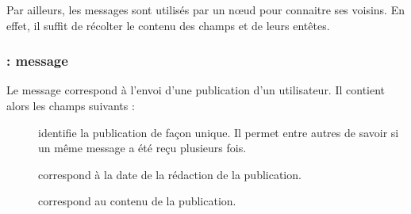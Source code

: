 Par ailleurs, les messages \msgheartbeat{} sont utilisés par un n\oe ud pour connaitre ses voisins.
En effet, il suffit de récolter le contenu des champs \fkfrom{} et \fknick{} de leurs entêtes.

\format{\foffers \apgdelim \fdemands}

\formatvar{\fvoffers}{\\\fvnodeid-\fvnick-\fvdistance,\fvnodeid-\fvnick-\fvdistance,\ldots}

\formatvar{\fvdemands}{\\\fvnodeid-\fvnick-\fvdistance,\fvnodeid-\fvnick-\fvdistance,\ldots}


\subsubsection{\Payload : message \msgpie}

Le message \msgpie{} correspond à l'envoi d'une publication d'un utilisateur.
Il contient alors les champs suivants :

\begin{description}
	\item[\fkmsgid] identifie la publication de façon unique. Il permet entre autres de savoir si un même message a été reçu plusieurs fois.
	\item[\fkmsgdate] correspond à la date de la rédaction de la publication.
	\item[\fkmsgcontent] correspond au contenu de la publication.
\end{description}

\format{\fmsgid \apgdelim \fmsgdate \apgdelim \fmsgcontent}


